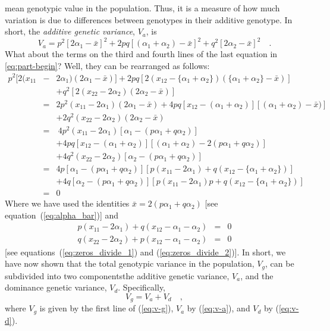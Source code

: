 \documentclass[12pt]{article}
\begin{document}
mean genotypic value in the population.  Thus, it is a measure of how
much variation is due to differences between genotypes in their
additive genotype.  In short, the {\it additive genetic variance},
$V_a$, is
\begin{equation}
V_a = p^2[2\alpha_1 - {\bar x}]^2 + 2pq[(\alpha_1 + \alpha_2) - {\bar x}]^2
          + q^2[2\alpha_2 - {\bar x}]^2 \quad .\label{eq:v-a}
\end{equation}
What about the terms on the third and fourth lines of the last
equation in \ref{eq:part-begin}?  Well, they can be rearranged as
follows:
\begin{eqnarray*}
p^2[2(x_{11} &-& 2\alpha_1)(2\alpha_1 - {\bar x})]
 + 2pq[2(x_{12} - \{\alpha_1+\alpha_2\})(\{\alpha_1+\alpha_2\} - {\bar
 x})] \\
 &&+ q^2[2(x_{22} - 2\alpha_2)(2\alpha_2 - {\bar x})] \\
&=& 2p^2(x_{11}-2\alpha_1)(2\alpha_1 - {\bar x})
   + 4pq[x_{12}-(\alpha_1+\alpha_2)][(\alpha_1+\alpha_2)-{\bar x})] \\
 &&+ 2q^2(x_{22}-2\alpha_2)(2\alpha_2 - {\bar x}) \\
&=&\ 4p^2(x_{11}-2\alpha_1)[\alpha_1 - (p\alpha_1+q\alpha_2)] \\
 &&+ 4pq[x_{12}-(\alpha_1+\alpha_2)][(\alpha_1+\alpha_2)-2(p\alpha_1+q\alpha_2)] \\
 &&+ 4q^2(x_{22}-2\alpha_2)[\alpha_2 - (p\alpha_1+q\alpha_2)] \\
&=& 4p[\alpha_1-(p\alpha_1+q\alpha_2)]
      [p(x_{11}-2\alpha_1) + q(x_{12}-\{\alpha_1+\alpha_2\})] \\
 &&+ 4q[\alpha_2-(p\alpha_1+q\alpha_2)]
      [p(x_{11}-2\alpha_1)p + q(x_{12}-\{\alpha_1+\alpha_2\})] \\
&=& 0
\end{eqnarray*}
Where we have used the identities ${\bar x} = 2(p\alpha_1 + q\alpha_2)$ [see
equation~(\ref{eq:alpha_bar})] and
\begin{eqnarray*}
p(x_{11} - 2\alpha_1) + q(x_{12} - \alpha_1 - \alpha_2) &=& 0 \\
q(x_{22} - 2\alpha_2) + p(x_{12} - \alpha_1 - \alpha_2) &=& 0
\end{eqnarray*}
[see equations~(\ref{eq:zeros_divide_1}) and (\ref{eq:zeros_divide_2})].
In short, we have now shown that the total genotypic variance in the
population, $V_g$, can be subdivided into two components{\dash}the
additive genetic variance, $V_a$, and the dominance genetic variance,
$V_d$.  Specifically,
\[
V_g = V_a + V_d \quad ,
\]
where $V_g$ is given by the first line of (\ref{eq:v-g}), $V_a$
by (\ref{eq:v-a}), and $V_d$ by (\ref{eq:v-d}).
\end{document}
